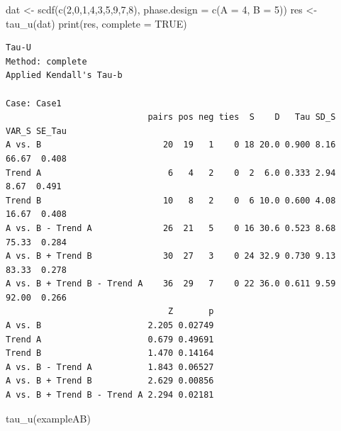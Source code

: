 \documentclass[
]{book}
\newenvironment{Shaded}{\begin{snugshade}}{\end{snugshade}}
\newcommand{\AttributeTok}[1]{\textcolor[rgb]{0.77,0.63,0.00}{#1}}
\newcommand{\ConstantTok}[1]{\textcolor[rgb]{0.00,0.00,0.00}{#1}}
\newcommand{\DecValTok}[1]{\textcolor[rgb]{0.00,0.00,0.81}{#1}}
\newcommand{\FunctionTok}[1]{\textcolor[rgb]{0.00,0.00,0.00}{#1}}
\newcommand{\NormalTok}[1]{#1}
\newcommand{\OtherTok}[1]{\textcolor[rgb]{0.56,0.35,0.01}{#1}}
\begin{document}
\begin{Shaded}
\begin{Highlighting}[]
\NormalTok{dat }\OtherTok{\textless{}{-}} \FunctionTok{scdf}\NormalTok{(}\FunctionTok{c}\NormalTok{(}\DecValTok{2}\NormalTok{,}\DecValTok{0}\NormalTok{,}\DecValTok{1}\NormalTok{,}\DecValTok{4}\NormalTok{,}\DecValTok{3}\NormalTok{,}\DecValTok{5}\NormalTok{,}\DecValTok{9}\NormalTok{,}\DecValTok{7}\NormalTok{,}\DecValTok{8}\NormalTok{), }\AttributeTok{phase.design =} \FunctionTok{c}\NormalTok{(}\AttributeTok{A =} \DecValTok{4}\NormalTok{, }\AttributeTok{B =} \DecValTok{5}\NormalTok{))}
\NormalTok{res }\OtherTok{\textless{}{-}} \FunctionTok{tau\_u}\NormalTok{(dat)}
\FunctionTok{print}\NormalTok{(res, }\AttributeTok{complete =} \ConstantTok{TRUE}\NormalTok{)}
\end{Highlighting}
\end{Shaded}

\begin{verbatim}
Tau-U
Method: complete 
Applied Kendall's Tau-b

Case: Case1 
                            pairs pos neg ties  S    D   Tau SD_S VAR_S SE_Tau
A vs. B                        20  19   1    0 18 20.0 0.900 8.16 66.67  0.408
Trend A                         6   4   2    0  2  6.0 0.333 2.94  8.67  0.491
Trend B                        10   8   2    0  6 10.0 0.600 4.08 16.67  0.408
A vs. B - Trend A              26  21   5    0 16 30.6 0.523 8.68 75.33  0.284
A vs. B + Trend B              30  27   3    0 24 32.9 0.730 9.13 83.33  0.278
A vs. B + Trend B - Trend A    36  29   7    0 22 36.0 0.611 9.59 92.00  0.266
                                Z       p
A vs. B                     2.205 0.02749
Trend A                     0.679 0.49691
Trend B                     1.470 0.14164
A vs. B - Trend A           1.843 0.06527
A vs. B + Trend B           2.629 0.00856
A vs. B + Trend B - Trend A 2.294 0.02181
\end{verbatim}

\begin{Shaded}
\begin{Highlighting}[]
\FunctionTok{tau\_u}\NormalTok{(exampleAB)}
\end{Highlighting}
\end{Shaded}
\end{document}
